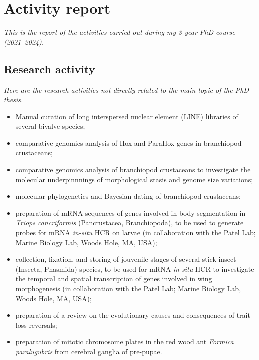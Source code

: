 {
\chapter*{\vspace{-3.5cm}Activity report}
\label{activityreport}
}

\setcounter{page}{1}

\small{\textit{This is the report of the activities carried out during my 3-year PhD course (2021--2024).}}

\section*{Research activity}
\small{\textit{Here are the research activities not directly related to the main topic of the PhD thesis.}}
\begin{itemize}
    \item Manual curation of long interspersed nuclear element (LINE) libraries of several bivalve species;
    \item comparative genomics analysis of Hox and ParaHox genes in branchiopod crustaceans;
    \item comparative genomics analysis of branchiopod crustaceans to investigate the molecular underpinnnings of morphological stasis and genome size variations;
    \item molecular phylogenetics and Bayesian dating of branchiopod crustaceans;
    \item preparation of mRNA sequences of genes involved in body segmentation in \textit{Triops cancriformis} (Pancrustacea, Branchiopoda), to be used to generate probes for mRNA \textit{in-situ} HCR on larvae (in collaboration with the Patel Lab; Marine Biology Lab, Woods Hole, MA, USA);
    \item collection, fixation, and storing of jouvenile stages of several stick insect (Insecta, Phasmida) species, to be used for mRNA \textit{in-situ} HCR to investigate the temporal and spatial transcription of genes involved in wing morphogenesis (in collaboration with the Patel Lab; Marine Biology Lab, Woods Hole, MA, USA);
    \item preparation of a review on the evolutionary causes and consequences of trait loss reversals;
    \item preparation of mitotic chromosome plates in the red wood ant \textit{Formica paralugubris} from cerebral ganglia of pre-pupae.

\end{itemize}

